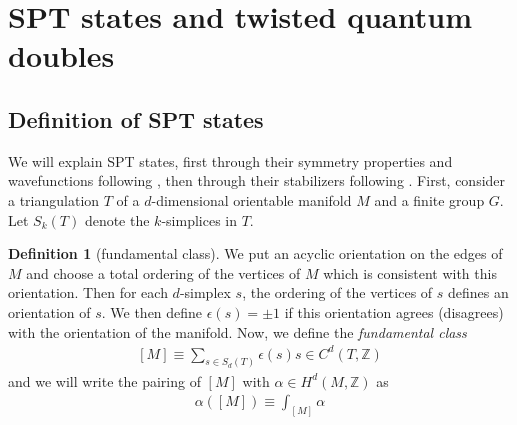 \documentclass{article}
\theoremstyle{definition}
\newtheorem{defn}{Definition}
\theoremstyle{definition}
\newcommand{\Z}{\mathbb Z}
\begin{document}
\section{SPT states and twisted quantum doubles}

\subsection{Definition of SPT states}
We will explain SPT states, first
through their symmetry properties and wavefunctions following 
\cite{lattice_models}, then through their stabilizers following \cite{Yoshida_2017}.
First, consider a triangulation $T$ of a $d$-dimensional orientable manifold $M$ and
a finite group $G$. Let $S_k(T)$ denote the $k$-simplices in $T$.
\begin{defn}[fundamental class]\label{defn:fundamental-class}
We put an acyclic orientation on the edges of $M$ and choose a
total ordering of the vertices of $M$ which is consistent with this orientation. Then for each $d$-simplex $s$, the ordering of the vertices
of $s$ defines an orientation of $s$. We then define
$\epsilon(s) = \pm 1$ if this orientation agrees (disagrees) with the
orientation of the manifold. Now, we define the \textit{fundamental class}
\begin{align}\label{}
[M] \equiv \sum_{s \in S_d(T)}\epsilon(s)s \in C^d(T, \Z)
\end{align}
and we will write the pairing of $[M]$ with $\alpha \in H^d(M, \Z)$ as
\begin{align}
\alpha([M]) \equiv \int_{[M]}\alpha
\end{align}
\end{defn}
\end{document}
